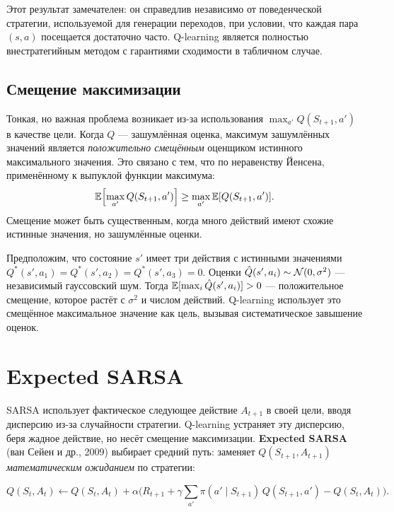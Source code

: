Этот результат замечателен: он справедлив независимо от поведенческой стратегии, используемой для генерации переходов, при условии, что каждая пара $(s,a)$ посещается достаточно часто.  Q-learning является полностью внестратегийным методом с гарантиями сходимости в табличном случае.

\subsection{Смещение максимизации}
\label{subsec:max-bias}

Тонкая, но важная проблема возникает из-за использования $\max_{a'} Q(S_{t+1},a')$ в качестве цели.  Когда $Q$ --- зашумлённая оценка, максимум зашумлённых значений является \emph{положительно смещённым} оценщиком истинного максимального значения.  Это связано с тем, что по неравенству Йенсена, применённому к выпуклой функции максимума:
\[
\operatorname{\mathbb{E}}\!\left[\max_{a'}Q(S_{t+1},a')\right] \ge \max_{a'}\operatorname{\mathbb{E}}[Q(S_{t+1},a')].
\]
Смещение может быть существенным, когда много действий имеют схожие истинные значения, но зашумлённые оценки.

\begin{example}
Предположим, что состояние $s'$ имеет три действия с истинными значениями $Q^*(s',a_1)=Q^*(s',a_2)=Q^*(s',a_3)=0$.  Оценки $\hat Q(s',a_i)\sim\mathcal{N}(0,\sigma^2)$ --- независимый гауссовский шум.  Тогда $\operatorname{\mathbb{E}}[\max_i\hat Q(s',a_i)] > 0$ --- положительное смещение, которое растёт с $\sigma^2$ и числом действий.  Q-learning использует это смещённое максимальное значение как цель, вызывая систематическое завышение оценок.
\end{example}

\section{Expected SARSA}
\label{sec:expected-sarsa}

SARSA использует фактическое следующее действие $A_{t+1}$ в своей цели, вводя дисперсию из-за случайности стратегии.  Q-learning устраняет эту дисперсию, беря жадное действие, но несёт смещение максимизации.  \textbf{Expected SARSA} (ван Сейен и др., 2009) выбирает средний путь: заменяет $Q(S_{t+1},A_{t+1})$ \emph{математическим ожиданием} по стратегии:

\begin{equation}
\label{eq:expected-sarsa}
Q(S_t,A_t) \leftarrow Q(S_t,A_t) + \alpha\Biggl(R_{t+1} + \gamma\sum_{a'}\pi(a'\mid S_{t+1})\,Q(S_{t+1},a') - Q(S_t,A_t)\Biggr).
\end{equation}


